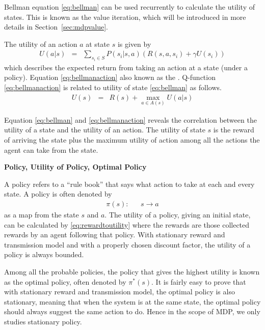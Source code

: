 Bellman equation \eqref{eq:bellman} can be used recurrently to calculate the utility of states. This is known as the value iteration, which will be introduced in more details in Section~\ref{sec:mdpvalue}.

The utility of an action $a$ at state $s$ is given by
\begin{eqnarray}
	U(a|s) &=& \sum_{s_i \in S} P(s_i|s,a)\left(R(s,a,s_i) + \gamma U(s_i)\right) \label{eq:bellmanaction}
\end{eqnarray}
which describes the expected return from taking an action at a state (under a policy). Equation \eqref{eq:bellmanaction} also known as the . Q-function \eqref{eq:bellmanaction} is related to utility of state \eqref{eq:bellman} as follows.
\begin{eqnarray}
	U(s) &=& R(s) + \max_{a\in A(s)} U(a|s) \nonumber
\end{eqnarray}
 
Equation \eqref{eq:bellman} and \eqref{eq:bellmanaction} reveals the correlation between the utility of a state and the utility of an action. The utility of state $s$ is the reward of arriving the state plus the maximum utility of action among all the actions the agent can take from the state.

\vspace{0.1in}
\noindent \textbf{Policy, Utility of Policy, Optimal Policy}
\vspace{0.1in}

A policy refers to a ``rule book'' that says what action to take at each and every state. A policy is often denoted by
\begin{eqnarray}
	\pi(s): && s \rightarrow a \label{eq:mdppolicy}
\end{eqnarray}
as a map from the state $s$ and $a$. The utility of a policy, giving an initial state, can be calculated by \eqref{eq:rewardtoutility} where the rewards are those collected rewards by an agent following that policy. With stationary reward and transmission model and with a properly chosen discount factor, the utility of a policy is always bounded. 

Among all the probable policies, the policy that gives the highest utility is known as the optimal policy, often denoted by $\pi^*(s)$. It is fairly easy to prove that with stationary reward and transmission model, the optimal policy is also stationary, meaning that when the system is at the same state, the optimal policy should always suggest the same action to do. Hence in the scope of MDP, we only studies stationary policy.

